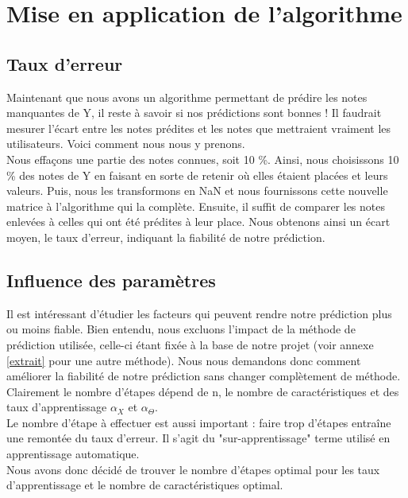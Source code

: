 \documentclass[a4paper,10pt]{article}
\begin{document}
\section{Mise en application de l'algorithme}

\subsection{Taux d'erreur}

Maintenant que nous avons un algorithme permettant de prédire les notes manquantes de Y, il reste à savoir si nos prédictions sont bonnes ! Il faudrait mesurer l'écart entre les notes prédites et les notes que mettraient vraiment les utilisateurs. Voici comment nous nous y prenons.\\

Nous effaçons une partie des notes connues, soit 10 \%. 
Ainsi, nous choisissons 10 \% des notes de Y en faisant en sorte de retenir où elles étaient placées et leurs valeurs. 
Puis, nous les transformons en NaN et nous fournissons cette nouvelle matrice à l'algorithme qui la complète.
Ensuite, il suffit de comparer les notes enlevées à celles qui ont été prédites à leur place. 
Nous obtenons ainsi un écart moyen, le taux d'erreur, indiquant la fiabilité de notre prédiction.

\subsection{Influence des paramètres}

Il est intéressant d'étudier les facteurs qui peuvent rendre notre prédiction plus ou moins fiable. Bien entendu, nous excluons l'impact de la méthode de prédiction utilisée, celle-ci étant fixée à la base de notre projet (voir annexe \ref{extrait} pour une autre méthode). Nous nous demandons donc comment améliorer la fiabilité de notre prédiction sans changer complètement de méthode.\\

Clairement le nombre d'étapes dépend de n, le nombre de caractéristiques et des taux d'apprentissage $\alpha_X$ et $\alpha_\Theta$.\\
Le nombre d'étape à effectuer est aussi important : faire trop d'étapes entraîne une remontée du taux d'erreur. Il s'agit du "sur-apprentissage" terme utilisé en apprentissage automatique.\\
Nous avons donc décidé de trouver le nombre d'étapes optimal pour les taux d'apprentissage et le nombre de caractéristiques optimal.\\
\end{document}
